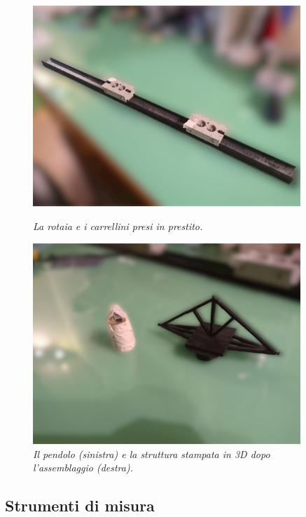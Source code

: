 \documentclass[11pt, a4paper, twoside, italian]{article}
\begin{document}
\begin{figure}[h!]
  \centering
\begin{minipage}[t]{0.45\textwidth}
  \centering
  \includegraphics[valign=t, width=0.9\textwidth]{../../media/img/rail_processed.png}
  \caption{\textit{La rotaia e i carrellini presi in prestito.}}
  \label{photo_rail}
\end{minipage}
\begin{minipage}[t]{0.45\textwidth}
  \centering
  \includegraphics[valign=t, width=0.9\textwidth]{../../media/img/crane_rail-processed.png}
  \caption{\textit{Il pendolo (sinistra) e la struttura stampata in 3D dopo l'assemblaggio
  (destra).}}
  \label{photo_crane}
\end{minipage}
\end{figure}

\subsection{Strumenti di misura}
\end{document}
